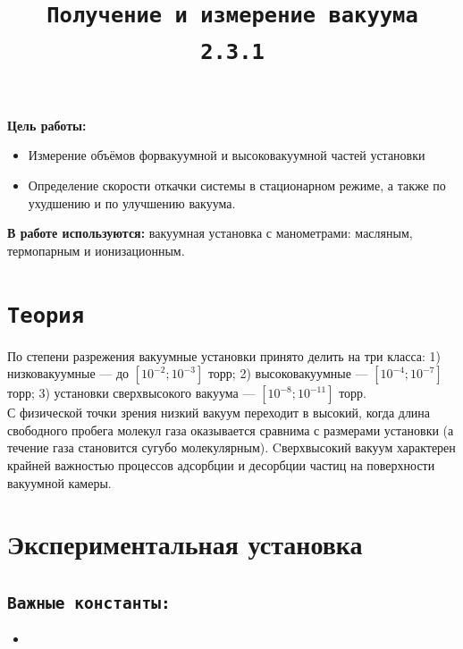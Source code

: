 \documentclass[11pt,a4paper]{article}
\title{\texttt{Получение и измерение вакуума \\ 2.3.1}}
\author{}
\date{}
\begin{document}
  \maketitle

\textbf{Цель работы:}
\begin{itemize}
  \item Измерение объёмов форвакуумной и высоковакуумной частей установки
  \item  Определение скорости откачки системы в
  стационарном режиме, а также по ухудшению и по улучшению вакуума.
\end{itemize}

\textbf{В работе используются:} вакуумная установка с манометрами: масляным, термопарным и ионизационным.

\section*{\texttt{Теория}}
По степени разрежения вакуумные установки принято делить на
три класса: 1) низковакуумные — до  $[10^{-2}; 10^{-3}]$ торр; 2) высоковакуумные — $[10^{-4}; 10^{-7}]$ торр; 
3) установки сверхвысокого вакуума — $[10^{-8};10^{-11}]$ торр.
\\ С физической точки зрения низкий вакуум переходит в высокий, когда длина свободного
 пробега молекул газа оказывается сравнима с 
размерами установки (а течение газа становится сугубо молекулярным). 
Cверхвысокий вакуум характерен крайней важностью 
процессов адсорбции и десорбции частиц на поверхности вакуумной камеры.


\section*{Экспериментальная установка}
\subsection*{\texttt{Важные константы:}}
  \begin{itemize}
    \item 
  \end{itemize}
\end{document}
